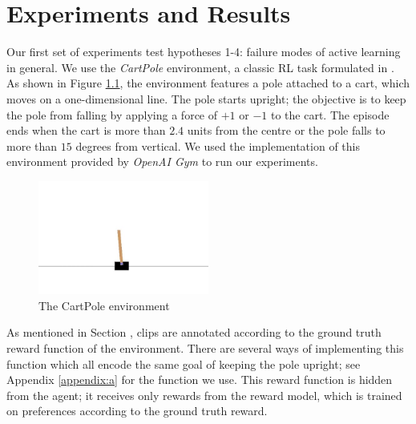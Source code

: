\documentclass[11pt, a4paper, bibliography=totoc]{report}
\begin{document}
\chapter{Experiments and Results}
Our first set of experiments test hypotheses 1-4: failure modes of active learning in general. We use the \textit{CartPole} environment, a classic RL task formulated in \cite{barto1983neuronlik}. As shown in Figure \ref{fig:cartpole}, the environment features a pole attached to a cart, which moves on a one-dimensional line. The pole starts upright; the objective is to keep the pole from falling by applying a force of $ +1 $ or $ -1 $ to the cart. The episode ends when the cart is more than $ 2.4 $ units from the centre or the pole falls to more than $ 15 $ degrees from vertical. We used the implementation of this environment provided by \textit{OpenAI Gym} \cite{brockman2016gym} to run our experiments.
\begin{figure}[h]
\centering
\includegraphics[width=0.5\textwidth]{cartpole-v0.jpg}
\caption{The CartPole environment \cite{gym2019cartpole}}
\label{fig:cartpole}
\end{figure}

As mentioned in Section \label{sec:arma}, clips are annotated according to the ground truth reward function of the environment. There are several ways of implementing this function which all encode the same goal of keeping the pole upright; see Appendix \ref{appendix:a} for the function we use. This reward function is hidden from the agent; it receives only rewards from the reward model, which is trained on preferences according to the ground truth reward.
\end{document}
